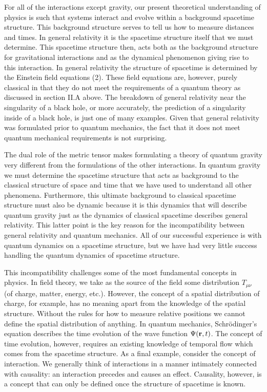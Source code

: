 For all of the interactions except gravity, our present theoretical
understanding of physics is such that systems interact and evolve within a
background spacetime structure. This background structure serves to tell us
how to measure distances and times. In general relativity it is the
spacetime structure itself that we must determine. This spacetime structure
then, acts both as the background structure for gravitational interactions
and as the dynamical phenomenon giving rise to this interaction. In general
relativity the structure of spacetime is determined by the Einstein field
equations (2). These field equations are, however, purely classical in that
they do not meet the requirements of a quantum theory as discussed in
section II.A above. The breakdown of general relativity near the singularity
of a black hole, or more accurately, the prediction of a singularity inside
of a black hole, is just one of many examples. Given that general relativity
was formulated prior to quantum mechanics, the fact that it does not meet
quantum mechanical requirements is not surprising.

The dual role of the metric tensor makes formulating a theory of quantum
gravity very different from the formulations of the other interactions. In
quantum gravity we must determine the spacetime structure that acts as
background to the classical structure of space and time that we have used to
understand all other phenomena. Furthermore, this ultimate background to
classical spacetime structure must also be dynamic because it is this
dynamics that will describe quantum gravity just as the dynamics of
classical spacetime describes general relativity. This latter point is the
key reason for the incompatibility between general relativity and quantum
mechanics. All of our successful experience is with quantum dynamics on a
spacetime structure, but we have had very little success handling the
quantum dynamics of spacetime structure.

This incompatibility challenges some of the most fundamental concepts in
physics. In field theory, we take as the source of the field some
distribution $T_{\mu \nu }$ (of charge, matter, energy, etc.). However, the
concept of a spatial distribution of charge, for example, has no meaning
apart from the knowledge of the spatial structure. Without the rules for how
to measure relative positions we cannot define the spatial distribution of
anything. In quantum mechanics, Schr\"{o}dinger's equation describes the
time evolution of the wave function $\Psi ({\bf r},t)$. The concept of time
evolution, however, requires an existing knowledge of temporal flow which
comes from the spacetime structure. As a final example, consider the concept
of interaction. We generally think of interactions in a manner intimately
connected with causality: an interaction precedes and causes an effect.
Causality, however, is a concept that can only be defined once the structure
of spacetime is known.

